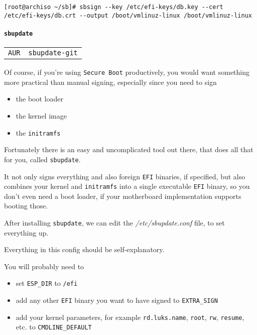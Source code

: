 \documentclass[9pt]{report}
\newenvironment{packagetable}
{\begin{longtabu}to \textwidth [b]{X[1,r]|X[1,l]}}
{\end{longtabu}}
\begin{document}
\begin{verbatim}
[root@archiso ~/sb]# sbsign --key /etc/efi-keys/db.key --cert /etc/efi-keys/db.crt --output /boot/vmlinuz-linux /boot/vmlinuz-linux
\end{verbatim}


\newpage

\hypertarget{x-sbupdate}{\paragraph{\texttt{sbupdate}}}
\begin{packagetable}
    \texttt{AUR} & \texttt{sbupdate-git} \\ 
\end{packagetable}

Of course, if you’re using \texttt{Secure Boot} productively, you would want something more practical than manual signing, especially since you need to sign


\begin{itemize}

    \item the boot loader

    \item the kernel image

    \item the \texttt{initramfs}

\end{itemize}


Fortunately there is an easy and uncomplicated tool out there, that does all that for you, called \texttt{sbupdate}.


It not only signs everything and also foreign \texttt{EFI} binaries, if specified, but also combines your kernel and \texttt{initramfs} into a single executable \texttt{EFI} binary, so you don’t even need a boot loader, if your motherboard implementation supports booting those.


After installing \texttt{sbupdate}, we can edit the \textit{/etc/sbupdate.conf} file, to set everything up.


Everything in this config should be self-explanatory.


You will probably need to


\begin{itemize}

    \item set \texttt{ESP\_DIR} to \texttt{/efi}

    \item add any other \texttt{EFI} binary you want to have signed to \texttt{EXTRA\_SIGN}

    \item add your kernel parameters, for example \texttt{rd.luks.name}, \texttt{root}, \texttt{rw}, \texttt{resume}, etc. to \texttt{CMDLINE\_DEFAULT}

\end{itemize}
\end{document}
